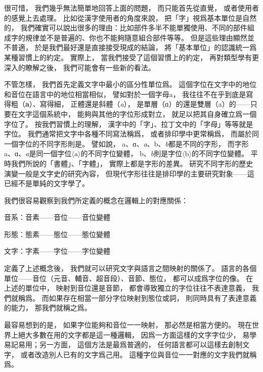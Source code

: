 很可惜，
我們幾乎無法簡單地回答上面的問題，
而只能首先從直覺，
或者使用者的感覺上去處理。
比如從漢字使用者的角度來說，
把「字」視爲基本單位是自然的，
我們確實可以說出很多的理由：比如部件多半不能單獨使用、不同的部件組成字的規律並不是普遍的、你也不能夠隨意組合部件等等。
但是這些理由顯然並不普適，
於是我們最好還是直接接受現成的結論，
將「基本單位」的認識統一爲某種習慣上的約定。
實際上，
當我們接受了這個習慣上的約定，
再對類型學有更深入的瞭解之後，
我們可能會有一些新的看法。


不管怎樣，
我們首先定義文字中最小的區分性單位爲。
這個字位在文字中的地位和音位在語言中的地位相當相似，
譬如對於一個字母a，
我往往不在乎到底是寫得粗（\textbf{a}）、寫得細，
正體還是斜體（\textit{a}），
是單層（ɑ）的還是雙層（a）的——只要在文字這個系統中，
能夠與其他的字位形成對立，
就足以把其自身確立爲一個字位了。
按我們習慣上的理解，
漢字中的「字」、拉丁文中的「字母」等等就是字位。
我們通常把文字中各種不同寫法稱爲，
或者排印學中更常稱爲，
而屬於同一個字位的不同字形則是。
譬如說，
a、ɑ、\textit{a}、b、\textit{b}都是不同的字形，
而字形a、ɑ、\textit{a}是同一個字位$\langle\text{a}\rangle$的不同字位變體，
b、\textit{b}則是字位$\langle \text{b}\rangle$的不同字位變體。
平時我們所說的「書體」、「字體」，
實際上都是字形的差異。
研究不同字形的歷史演變一般是文字史的研究內容，
但現代字形往往是排印學的主要研究對象——這已經不是單純的文字學了。

我們很容易觀察到我們所定義的概念在邏輯上的對應關係：
\begin{ExampleBlock}
音系：音素——音位——音位變體

形態：態素——態位——態位變體

文字：字素——字位——字位變體
\end{ExampleBlock}

定義了上述概念後，
我們就可以研究文字與語言之間映射的關係了。
語言的各個單位——音位（元音、輔音、超音段）、音節、態位，
都可以成爲字位的像。
在上述的單位中，
映射到音位還是音節，
都會導致獨立的字位往往不表達意義，
我們就稱爲。
而如果存在相當一部分字位映射到態位或詞，
則同時具有了表達意義的能力，
那我們就稱之爲。

最容易想到的是，
如果字位能夠和音位一一映射，
那必然是相當方便的。
現在世界上絕大多數在用的文字都是這一種邏輯，
因爲一方面這樣的文字字位少，
易學易記易用；另一方面，
這個方法是最爲普適的，
任何語言都可以這樣去創制文字，
或者改造別人已有的文字爲己用。
這種字位與音位一一對應的文字我們就稱爲。

